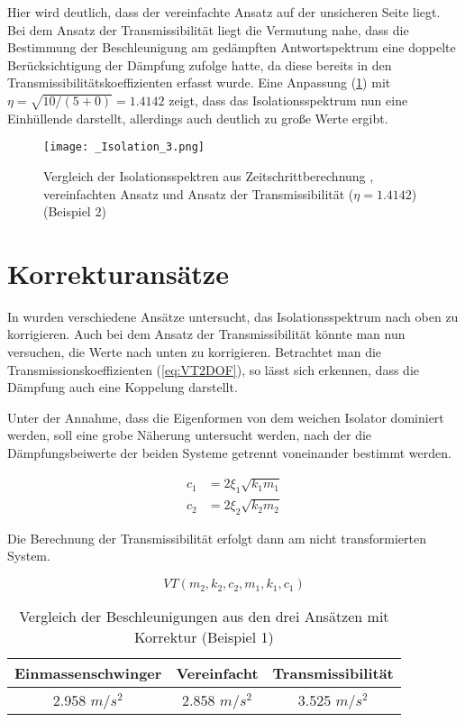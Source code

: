 Hier wird deutlich, dass der vereinfachte Ansatz auf der unsicheren Seite liegt.
Bei dem Ansatz der Transmissibilität liegt die Vermutung nahe, dass die Bestimmung der Beschleunigung am gedämpften Antwortspektrum eine doppelte Berücksichtigung der Dämpfung zufolge hatte, da diese bereits in den Transmissibilitätskoeffizienten erfasst wurde.
Eine Anpassung (\cref{fig:Isolation2}) mit $\eta = \sqrt{10/(5+0)} = 1.4142$ zeigt, dass das Isolationsspektrum nun eine Einhüllende darstellt, allerdings auch deutlich zu große Werte ergibt.

\begin{figure}[H]
    \centering
    \texttt{[image: \_Isolation\_3.png]}
    \caption{Vergleich der Isolationsspektren aus Zeitschrittberechnung \cite{Isemann}, vereinfachten Ansatz und Ansatz der Transmissibilität ($\eta = 1.4142$) (Beispiel 2)}
    \label{fig:Isolation2}
\end{figure}

\section{Korrekturansätze}
\label{sec:Korrekturansaetze}

In \cite{Isemann} wurden verschiedene Ansätze untersucht, das Isolationsspektrum nach oben zu korrigieren.
Auch bei dem Ansatz der Transmissibilität könnte man nun versuchen, die Werte nach unten zu korrigieren. Betrachtet man die Transmissionskoeffizienten (\cref{eq:VT2DOF}), so lässt sich erkennen, dass die Dämpfung auch eine Koppelung darstellt. 

Unter der Annahme, dass die Eigenformen von dem weichen Isolator dominiert werden, soll eine grobe Näherung untersucht werden, nach der die Dämpfungsbeiwerte der beiden Systeme getrennt voneinander bestimmt werden.

\begin{align*}
c_1 &= 2 \xi_1 \sqrt{k_1 m_1}\\
c_2 &= 2 \xi_2 \sqrt{k_2 m_2}
\end{align*}

Die Berechnung der Transmissibilität erfolgt dann am nicht transformierten System.

\begin{equation*}
VT(m_2, k_2, c_2, m_1, k_1, c_1)
\end{equation*} 

\begin{table}[H]
\centering
\begin{tabular}{ |c|c|c| } 
 \hline
 Einmassenschwinger & Vereinfacht & Transmissibilität\\
 \hline\hline
 2.958 $m/s^2$ & 2.858 $m/s^2$ & 3.525 $m/s^2$\\
 \hline
\end{tabular}
\caption{Vergleich der Beschleunigungen aus den drei Ansätzen mit Korrektur (Beispiel 1)}
\end{table}

